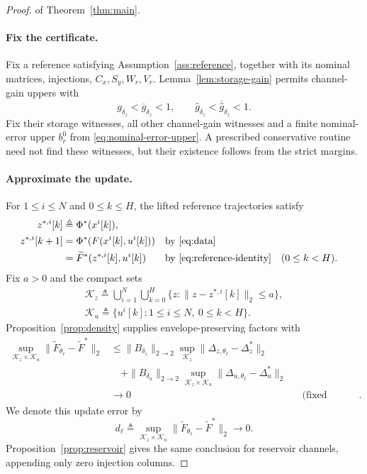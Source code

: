 \documentclass{l4dc2027}
\newcommand{\eqdef}{\triangleq}
\begin{document}
\begin{proof} of Theorem~\ref{thm:main}.
\paragraph{Fix the certificate.}
Fix a reference satisfying Assumption~\ref{ass:reference}, together with its nominal matrices, injections, \mbox{$C_x,S_y,W_r,V_r$}.
Lemma~\ref{lem:storage-gain} permits channel-gain uppers with
\[
 g_{\delta_z}<\overline g_{\delta_z}<1,\qquad
 \widehat g_{\delta_z}<\overline{\widehat g}_{\delta_z}<1.
\]
Fix their storage witnesses, all other channel-gain witnesses and a finite nominal-error upper \mbox{$b_r^0$} from \eqref{eq:nominal-error-upper}.
A prescribed conservative routine need not find these witnesses, but their existence follows from the strict margins.

\paragraph{Approximate the update.}
For \mbox{$1\le i\le N$} and \mbox{$0\le k\le H$}, the lifted reference trajectories satisfy
\[
 \begin{aligned}
 z^{*,i}[k]&\eqdef\Phi^*(x^i[k]),\\
 z^{*,i}[k+1]
 &=\Phi^*(F(x^i[k],u^i[k]))
 &&\text{by \eqref{eq:data}}\\
 &=\widetilde F^*(z^{*,i}[k],u^i[k])
 &&\text{by \eqref{eq:reference-identity}}\quad(0\le k<H).
 \end{aligned}
\]
Fix \mbox{$a>0$} and the compact sets
\[
 \begin{gathered}
 \mathcal K_z\eqdef\bigcup_{i=1}^N\bigcup_{k=0}^H
 \{z:\|z-z^{*,i}[k]\|_2\le a\},\\
 \mathcal K_u\eqdef\{u^i[k]:1\le i\le N,\ 0\le k<H\}.
 \end{gathered}
\]
Proposition~\ref{prop:density} supplies envelope-preserving factors with
\[
 \begin{aligned}
 \sup_{\mathcal K_z\times\mathcal K_u}
 \|\widetilde F_{\theta_\ell}-\widetilde F^*\|_2
 &\le\|B_{\delta_z}\|_{2\to2}
       \sup_{\mathcal K_z}\|\Delta_{z,\theta_\ell}-\Delta_z^*\|_2\\
 &\quad+\|B_{\delta_u}\|_{2\to2}
       \sup_{\mathcal K_z\times\mathcal K_u}
           \|\Delta_{u,\theta_\ell}-\Delta_u^*\|_2\\
 &\longrightarrow0
 &&\text{(fixed injections)}.
 \end{aligned}
\]
We denote this update error by
\begin{equation}\label{eq:uniform-update-approximation}
 d_\ell\eqdef\sup_{\mathcal K_z\times\mathcal K_u}
 \|\widetilde F_{\theta_\ell}-\widetilde F^*\|_2\longrightarrow0.
\end{equation}
Proposition~\ref{prop:reservoir} gives the same conclusion for reservoir channels, appending only zero injection columns.


\end{proof}
\end{document}

